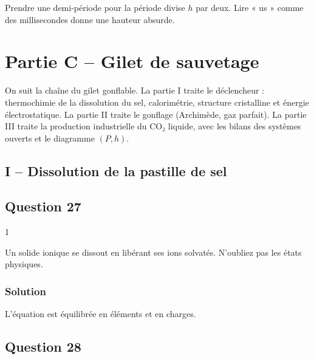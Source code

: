 \documentclass[11pt,a4paper]{article}
\newcommand{\equationajustee}[1]{%
  \sbox{\boiteequation}{$\displaystyle #1$}%
  \ifdim\wd\boiteequation>\linewidth
    \[\resizebox{\linewidth}{!}{\usebox{\boiteequation}}\]%
  \else
    \[#1\]%
  \fi}
\begin{document}
\begin{piege}

Prendre une demi-période pour la période divise \(h\) par deux. Lire « us » comme des millisecondes donne une hauteur absurde.

\end{piege}

\hypertarget{partie-c-gilet-de-sauvetage}{%
\section{Partie C -- Gilet de sauvetage}\label{partie-c-gilet-de-sauvetage}}

On suit la chaîne du gilet gonflable. La partie I traite le déclencheur : thermochimie de la dissolution du sel, calorimétrie, structure cristalline et énergie électrostatique. La partie II traite le gonflage (Archimède, gaz parfait). La partie III traite la production industrielle du CO₂ liquide, avec les bilans des systèmes ouverts et le diagramme \((P,h)\).

\hypertarget{i-dissolution-de-la-pastille-de-sel}{%
\subsection{I -- Dissolution de la pastille de sel}\label{i-dissolution-de-la-pastille-de-sel}}

\hypertarget{question-27}{%
\subsection{Question 27}\label{question-27}}

\begin{indication}{1}

Un solide ionique se dissout en libérant ses ions solvatés. N'oubliez pas les états physiques.

\end{indication}

\hypertarget{solution-26}{%
\subsubsection{Solution}\label{solution-26}}

\equationajustee{\boxed{\mathrm{NaCl_{(s)}\longrightarrow Na^+_{(aq)}+Cl^-_{(aq)}}}}

L'équation est équilibrée en éléments et en charges.

\hypertarget{question-28}{%
\subsection{Question 28}\label{question-28}}
\end{document}
